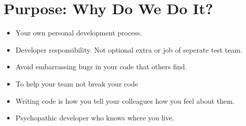 \documentclass{article}
\begin{document}
\sloppy
\section{Purpose: Why Do We Do It?}
\begin{itemize}
    \item Your own personal development process.
    \item Developer responsibility. Not optional extra or job of seperate test team.
    \item Avoid embarrassing bugs in your code that others find.
    \item To help your team not break your code
    \item Writing code is how you tell your colleagues how you feel about them.
    \item Psychopathic developer who knows where you live.
\end{itemize}
\end{document}
